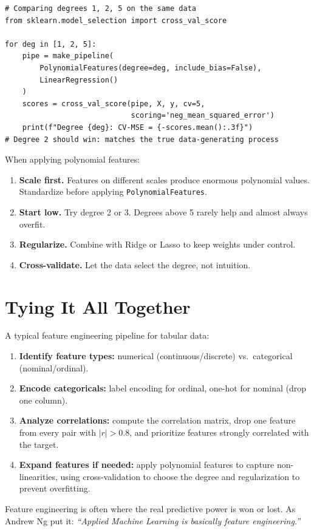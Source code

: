 \begin{lstlisting}[style=pythonstyle]
# Comparing degrees 1, 2, 5 on the same data
from sklearn.model_selection import cross_val_score

for deg in [1, 2, 5]:
    pipe = make_pipeline(
        PolynomialFeatures(degree=deg, include_bias=False),
        LinearRegression()
    )
    scores = cross_val_score(pipe, X, y, cv=5,
                             scoring='neg_mean_squared_error')
    print(f"Degree {deg}: CV-MSE = {-scores.mean():.3f}")
# Degree 2 should win: matches the true data-generating process
\end{lstlisting}

\begin{remark}
When applying polynomial features:
\begin{enumerate}
    \item \textbf{Scale first.} Features on different scales produce enormous polynomial values. Standardize before applying \texttt{PolynomialFeatures}.
    \item \textbf{Start low.} Try degree 2 or 3. Degrees above 5 rarely help and almost always overfit.
    \item \textbf{Regularize.} Combine with Ridge or Lasso to keep weights under control.
    \item \textbf{Cross-validate.} Let the data select the degree, not intuition.
\end{enumerate}
\end{remark}

\section*{Tying It All Together}

A typical feature engineering pipeline for tabular data:

\begin{enumerate}
    \item \textbf{Identify feature types:} numerical (continuous/discrete) vs.\ categorical (nominal/ordinal).
    \item \textbf{Encode categoricals:} label encoding for ordinal, one-hot for nominal (drop one column).
    \item \textbf{Analyze correlations:} compute the correlation matrix, drop one feature from every pair with $|r| > 0.8$, and prioritize features strongly correlated with the target.
    \item \textbf{Expand features if needed:} apply polynomial features to capture non-linearities, using cross-validation to choose the degree and regularization to prevent overfitting.
\end{enumerate}

Feature engineering is often where the real predictive power is won or lost. As Andrew Ng put it: \emph{``Applied Machine Learning is basically feature engineering.''}
